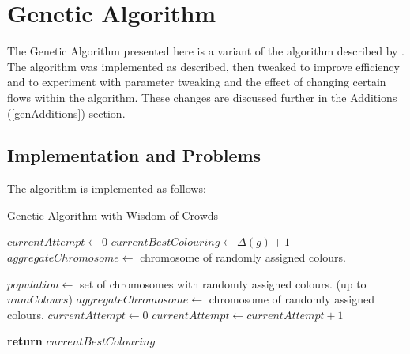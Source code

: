 \section{Genetic Algorithm}
The Genetic Algorithm presented here is a variant of the algorithm described by \cite{bib:GeneticAlg}. The algorithm was implemented as described, then tweaked to improve efficiency and to experiment with parameter tweaking and the effect of changing certain flows within the algorithm. These changes are discussed further in the Additions (\ref{genAdditions}) section. 

\subsection{Implementation and Problems}
The algorithm is implemented as follows:

\begin{algorithm}[H]
    \caption{Genetic Algorithm with Wisdom of Crowds}
    \label{alg:GA}
    \begin{algorithmic}[1] %
         			
			\State $currentAttempt \gets 0$	
			\State $currentBestColouring \gets \Delta \left( g \right) +1$
			\State $aggregateChromosome \gets$ chromosome of randomly assigned colours.
			
				\State $population \gets$ set of chromosomes with randomly assigned colours. (up to $numColours$)
					\State $aggregateChromosome \gets$ chromosome of randomly assigned colours.
					\State $currentAttempt \gets 0$
				\Else
					\State $currentAttempt \gets currentAttempt + 1$
				\EndIf
         
            \EndWhile
            \State \textbf{return} $currentBestColouring$
        \EndProcedure
    \end{algorithmic}
\end{algorithm}

